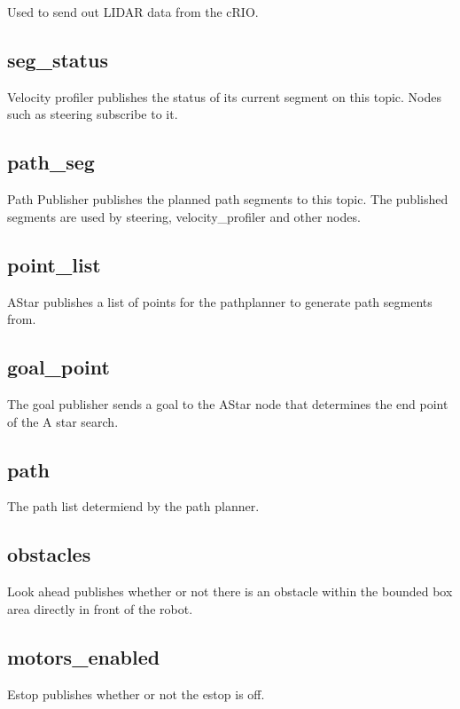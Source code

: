 \noindent Used to send out LIDAR data from the cRIO.

\subsection{seg\_status}
Velocity profiler publishes the status of its current segment on this
topic.  Nodes such as steering subscribe to it.


\subsection{path\_seg}
Path Publisher publishes the planned path segments to this topic.  The
published segments are used by steering, velocity\_profiler and other nodes.

\subsection{point\_list}
AStar publishes a list of points for the pathplanner to generate path segments from.
\subsection{goal\_point}
The goal publisher sends a goal to the AStar node that determines the end point of the A star search.
\subsection{path}
The path list determiend by the path planner.
\subsection{obstacles}
Look ahead publishes whether or not there is an obstacle within the bounded box area directly in front of the robot.
\subsection{motors\_enabled}
Estop publishes whether or not the estop is off.
